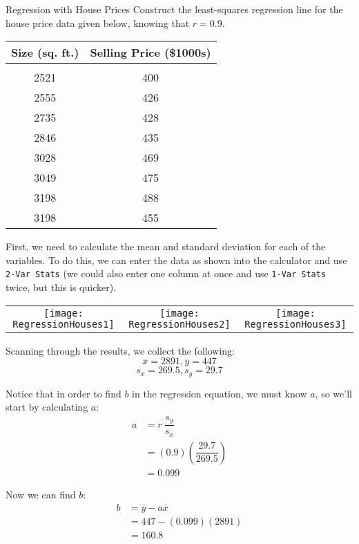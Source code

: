 \begin{example}{Regression with House Prices}
Construct the least-squares regression line for the house price data given below, knowing that $r=0.9$.
\begin{center}
\begin{tabular}{c c}
\textbf{Size (sq. ft.)} & \textbf{Selling Price (\$1000s)}\\
\hline
& \\
2521 & 400\\
2555 & 426\\
2735 & 428\\
2846 & 435\\
3028 & 469\\
3049 & 475\\
3198 & 488\\
3198 & 455\\
\end{tabular}
\end{center}

\sol
First, we need to calculate the mean and standard deviation for each of the variables.  To do this, we can enter the data as shown into the calculator and use \texttt{2-Var Stats} (we could also enter one column at once and use \texttt{1-Var Stats} twice, but this is quicker).
\begin{center}
\begin{tabular}{c c c}
\texttt{[image: RegressionHouses1]}
& \texttt{[image: RegressionHouses2]}
& \texttt{[image: RegressionHouses3]}
\end{tabular}
\end{center}
\pagebreak

Scanning through the results, we collect the following:
\[\overline{x} = 2891, \overline{y} = 447\]
\[s_x = 269.5, s_y = 29.7\]

Notice that in order to find $b$ in the regression equation, we must know $a$, so we'll start by calculating $a$:
\begin{align*}
a &= r\ \dfrac{s_y}{s_x}\\
&= (0.9)\left(\dfrac{29.7}{269.5}\right)\\
&= 0.099
\end{align*}

Now we can find $b$:
\begin{align*}
b &= \overline{y} - a\overline{x}\\
&= 447 - (0.099)(2891)\\
&= 160.8
\end{align*}


\end{example}
